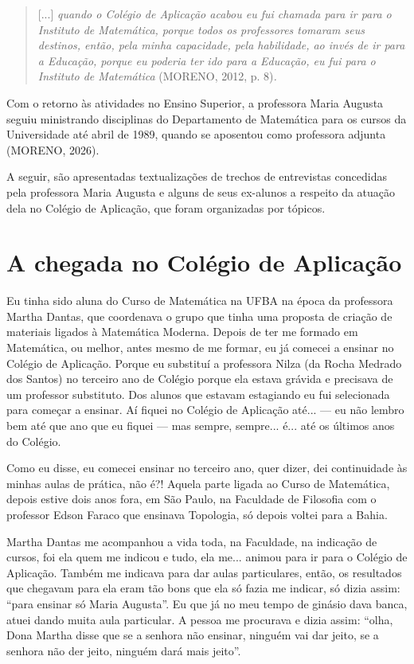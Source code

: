 \documentclass{hipatia}
\begin{document}
\begin{quote}
{[}...{]} \emph{quando o Colégio de Aplicação acabou eu fui chamada para
ir para o Instituto de Matemática, porque todos os professores tomaram seus
destinos, então, pela minha capacidade, pela habilidade, ao invés de ir
para a Educação, porque eu poderia ter ido para a Educação, eu fui para o
Instituto de Matemática} (MORENO, 2012, p. 8)\emph{.}
\end{quote}

Com o retorno às atividades no Ensino Superior, a professora Maria
Augusta seguiu ministrando disciplinas do Departamento de Matemática
para os cursos da Universidade até abril de 1989, quando se aposentou
como professora adjunta (MORENO, 2026).

A seguir, são apresentadas textualizações de trechos de entrevistas
concedidas pela professora Maria Augusta e alguns de seus ex-alunos a
respeito da atuação dela no Colégio de Aplicação, que foram organizadas
por tópicos.

\itshape

\section{A chegada no Colégio de Aplicação}

Eu tinha sido aluna do Curso de Matemática na UFBA na época da
professora Martha Dantas, que coordenava o grupo que tinha uma proposta
de criação de materiais ligados à Matemática Moderna. Depois de ter me
formado em Matemática, ou melhor, antes mesmo de me formar, eu já
comecei a ensinar no Colégio de Aplicação. Porque eu substituí a
professora Nilza (da Rocha Medrado dos Santos) no terceiro ano de
Colégio porque ela estava grávida e precisava de um professor
substituto. Dos alunos que estavam estagiando eu fui selecionada para
começar a ensinar. Aí fiquei no Colégio de Aplicação até... --- eu não
lembro bem até que ano que eu fiquei --- mas sempre, sempre... é... até
os últimos anos do Colégio.

Como eu disse, eu comecei ensinar no terceiro ano, quer dizer, dei
continuidade às minhas aulas de prática, não é?! Aquela parte ligada ao
Curso de Matemática, depois estive dois anos fora, em São Paulo, na
Faculdade de Filosofia com o professor Edson Faraco que ensinava
Topologia, só depois voltei para a Bahia.

Martha Dantas me acompanhou a vida toda, na Faculdade, na indicação de
cursos, foi ela quem me indicou e tudo, ela me... animou para ir para o
Colégio de Aplicação. Também me indicava para dar aulas particulares,
então, os resultados que chegavam para ela eram tão bons que ela só
fazia me indicar, só dizia assim: ``para ensinar só Maria Augusta''. Eu
que já no meu tempo de ginásio dava banca, atuei dando muita aula
particular. A pessoa me procurava e dizia assim: ``olha, Dona Martha
disse que se a senhora não ensinar, ninguém vai dar jeito, se a senhora
não der jeito, ninguém dará mais jeito''.
\end{document}
